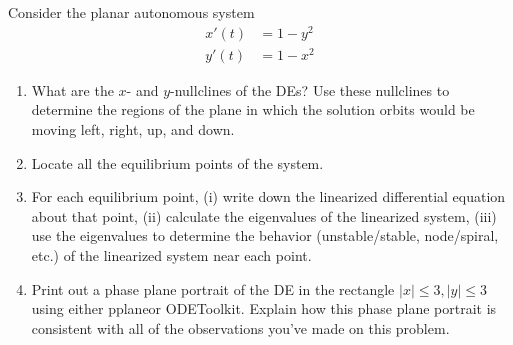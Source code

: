 \documentclass[12pt,letterpaper]{hmcpset}
\begin{document}

\begin{problem}[1]
    Consider the planar autonomous system 
    \begin{align*}
        x'(t)&=1-y^2\\
        y'(t)&=1-x^2
    \end{align*}
    \begin{enumerate}
        \item What are the $x$- and $y$-nullclines of the DEs?  Use
            these nullclines to determine the regions of the plane in
            which the solution orbits would be moving left, right, up,
            and down.
        \item Locate all the equilibrium points of the system.
        \item For each equilibrium point, (i) write down the
            linearized differential equation about that point, (ii)
            calculate the eigenvalues of the linearized system, (iii)
            use the eigenvalues to determine the behavior
            (unstable/stable, node/spiral, etc.) of the linearized
            system near each point.
        \item Print out a phase plane portrait of the DE in the
            rectangle $|x|\leq3,|y|\leq3$ using either
            pplane\footnotemark or ODEToolkit\footnotemark.
            Explain how this phase plane portrait is consistent with all
            of the observations you've made on this problem.
    \end{enumerate}
\end{problem}
\begin{solution}
    \vfill
\end{solution}
\newpage
\end{document}
